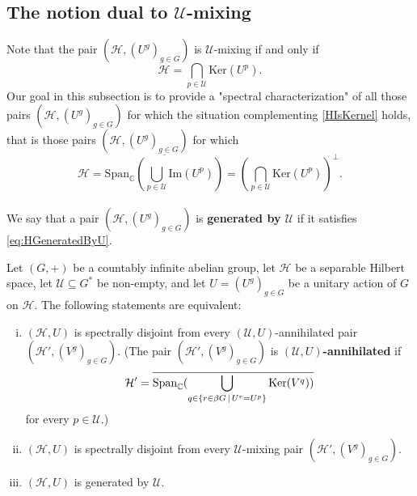 \documentclass[graybox]{svmult}
\theoremstyle{definition}
\begin{document}
\subsection{The notion dual to \texorpdfstring{$\mathcal U$}{\mathcal U}-mixing}
Note that the pair $(\mathcal H,(U^g)_{g\in G})$ is $\mathcal U$-mixing if and only if
\begin{equation}\label{HIsKernel}
\mathcal H=\bigcap_{p\in\mathcal U}\text{Ker}(U^p).
\end{equation}
Our goal in this subsection is to provide a "spectral characterization" of all those pairs $(\mathcal H,(U^g)_{g\in G})$ for which the situation complementing \eqref{HIsKernel} holds, that is those pairs  $(\mathcal H,(U^g)_{g\in G})$ for which
\begin{equation}\label{eq:HGeneratedByU}
\mathcal H=\overline{\text{Span}_\mathbb C\left( \bigcup_{p\in\mathcal U}\text{Im}(U^p)\right)}=\left(\bigcap_{p\in\mathcal U}\text{Ker}(U^p)\right)^\perp.
\end{equation}\\ 
We say that a pair $(\mathcal H,(U^g)_{g\in G})$ is \textbf{generated by  $\mathcal U$} if it satisfies \eqref{eq:HGeneratedByU}.

\begin{theorem}\label{0.thm:SpectralDisjointnessTheorem}
    Let $(G,+)$ be a countably infinite abelian group, let $\mathcal H$ be a separable Hilbert space, let $\mathcal U\subseteq G^*$ be non-empty, and let $U=(U^g)_{g\in G}$ be a unitary action of $G$ on $\mathcal H$.  
    The following statements are equivalent:
    \begin{enumerate}[(i)]
     \item $(\mathcal H,U)$ is spectrally disjoint from every $(\mathcal U,U)$-annihilated pair $(\mathcal H',(V^g)_{g\in G})$. (The pair $(\mathcal H',(V^g)_{g\in G})$ is \textbf{$(\mathcal U,U)$-annihilated} if 
       $$\mathcal H'= \overline{\text{{\rm Span}}_{\mathbb C}(\bigcup_{q\in\{r\in\beta G\,|\,U^r=U^p\}}\text{Ker}(V^q))}$$
       for every $p\in\mathcal U$.)
      \item $(\mathcal H,U)$ is spectrally disjoint from every $\mathcal U$-mixing pair $(\mathcal H',(V^g)_{g\in G})$. 
    \item $(\mathcal H, U)$ is generated by $\mathcal U$.
    \end{enumerate}
\end{theorem}
\end{document}
